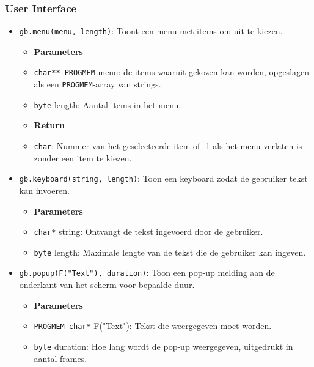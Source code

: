 \documentclass[a4paper,titlepage,12pt]{article}
\begin{document}
	\subsubsection{User Interface}
	\begin{itemize}
		\item \texttt{gb.menu(menu, length)}:
		Toont een menu met items om uit te kiezen.
		\begin{itemize}
			\item [] \textbf{Parameters}
			\item \texttt{char** PROGMEM} menu: de items waaruit gekozen kan worden, opgeslagen als een \texttt{PROGMEM}-array van strings.
			\item \texttt{byte} length: Aantal items in het menu.
		\end{itemize}
		\samepage
		\begin{itemize}
			\item [] \textbf{Return}
			\item \texttt{char}: Nummer van het geselecteerde item of -1 als het menu verlaten is zonder een item te kiezen.
		\end{itemize}
	
		\item \texttt{gb.keyboard(string, length)}:
		Toon een keyboard zodat de gebruiker tekst kan invoeren.
		\begin{itemize}
			\item [] \textbf{Parameters}
			\item \texttt{char*} string: Ontvangt de tekst ingevoerd door de gebruiker.
			\item \texttt{byte} length: Maximale lengte van de tekst die de gebruiker kan ingeven.
		\end{itemize}
	
		\item \texttt{gb.popup(F("Text"), duration)}: Toon een pop-up melding aan de onderkant van het scherm voor bepaalde duur.
		\begin{itemize}
			\item [] \textbf{Parameters}
			\item \texttt{PROGMEM char*} F("Text"): Tekst die weergegeven moet worden.
			\item \texttt{byte} duration: Hoe lang wordt de pop-up weergegeven, uitgedrukt in aantal frames.
		\end{itemize}
	\end{itemize}
	
\end{document}
